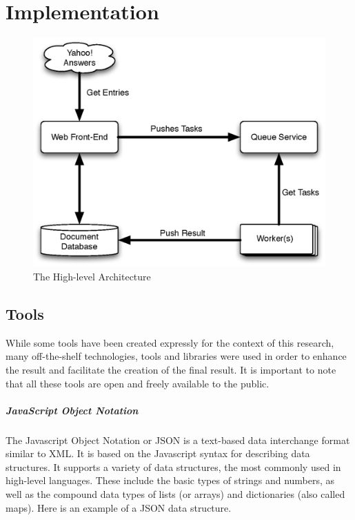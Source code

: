 \chapter{Implementation} %
\label{cha:implementation}

\begin{figure}[ht!]
  \begin{center}
    \includegraphics[width=\linewidth]{images/architecture}
  \end{center}
  \caption{The High-level Architecture}\label{fig:architecture}
\end{figure}

\section{Tools} %
\label{sec:tools}

While some tools have been created expressly for the context of this research, many off-the-shelf technologies, tools and libraries were used in order to enhance the result and facilitate the creation of the final result. It is important to note that all these tools are open and freely available to the public.

\paragraph{JavaScript Object Notation} %
\label{par:javascript_object_notation}

The Javascript Object Notation or JSON is a text-based data interchange format similar to XML. It is based on the Javascript syntax for describing data structures. It supports a variety of data structures, the most commonly used in high-level languages. These include the basic types of strings and numbers, as well as the compound data types of lists (or arrays) and dictionaries (also called maps). Here is an example of a JSON data structure.

